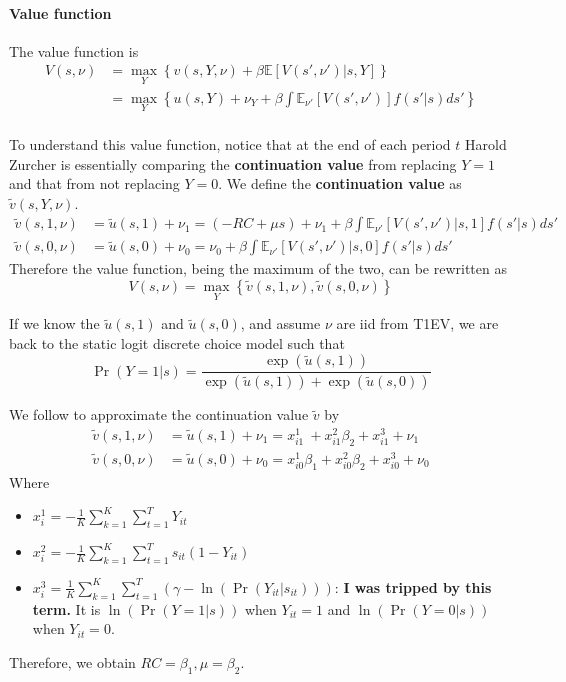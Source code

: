 \documentclass[12pt]{article}[margin=1in]
\begin{document}
\paragraph{Value function} The value function is
\begin{equation*}
    \begin{split}
        V(s, \nu) & = \max_{Y} \left\{ v(s,Y,\nu) + \beta \mathbb{E}[V(s', \nu')|s,Y] \right\}                       \\
        & = \max_{Y} \left\{ u(s,Y)+\nu_Y + \beta \int \mathbb{E}_{\nu'}[V(s', \nu')] f(s'|s) ds' \right\} \\
    \end{split}
\end{equation*}

To understand this value function, notice that at the end of each period $t$
Harold Zurcher is essentially comparing the \textbf{continuation value} from
replacing $Y=1$ and that from not replacing $Y=0$. We define the
\textbf{continuation value} as $\tilde{v}(s,Y,\nu)$.
\begin{align*}
    \tilde{v}(s,1,\nu) & = \tilde{u}(s,1) + \nu_1=  (-RC + \mu s) +\nu_1 + \beta \int \mathbb{E}_{\nu'}[V(s', \nu')|s,1] f(s'|s) ds' \\
    \tilde{v}(s,0,\nu) & = \tilde{u}(s,0)+\nu_0 = \nu_0+\beta \int \mathbb{E}_{\nu'}[V(s', \nu')|s,0] f(s'|s) ds'
\end{align*}
Therefore the value function, being the maximum of the two, can be rewritten as
\begin{equation*}
    V(s, \nu) = \max_Y\left\{ \tilde{v}(s,1,\nu), \tilde{v}(s,0,\nu) \right\}
\end{equation*}

If we know the $\tilde{u}(s,1)$ and $\tilde{u}(s,0)$, and assume $\nu$ are iid
from T1EV, we are back to the static logit discrete choice model such that
\begin{equation*}
    \Pr(Y=1|s) = \frac{\exp(\tilde{u}(s,1))}{\exp(\tilde{u}(s,1)) + \exp(\tilde{u}(s,0))}
\end{equation*}

We follow \citet{bajari2007estimating} to approximate the continuation value
$\tilde{v}$ by
\begin{align*}
    \tilde{v}(s,1,\nu) & = \tilde{u}(s,1) + \nu_1 = x_{i1}^1\ + x_{i1}^2\beta_2 + x_{i1}^3+ \nu_1     \\
    \tilde{v}(s,0,\nu) & = \tilde{u}(s,0) +\nu_0 = x_{i0}^1\beta_1 + x_{i0}^2\beta_2 + x_{i0}^3+\nu_0
\end{align*}
Where
\begin{itemize}
    \item $x_{i}^1 = -\frac{1}{K}\sum_{k=1}^K \sum_{t=1}^T Y_{it}$
    \item $x_{i}^2 = -\frac{1}{K}\sum_{k=1}^K \sum_{t=1}^T s_{it}(1-Y_{it})$
    \item $x_{i}^3 = \frac{1}{K}\sum_{k=1}^K \sum_{t=1}^T (\gamma-\ln(\Pr(Y_{it}|s_{it})))$: \textbf{I was tripped by this term.} It is $\ln(\Pr(Y=1|s))$ when $Y_{it}=1$ and $\ln(\Pr(Y=0|s))$ when $Y_{it}=0$.
\end{itemize}
Therefore, we obtain $RC=\beta_1, \mu=\beta_2$.
\end{document}

